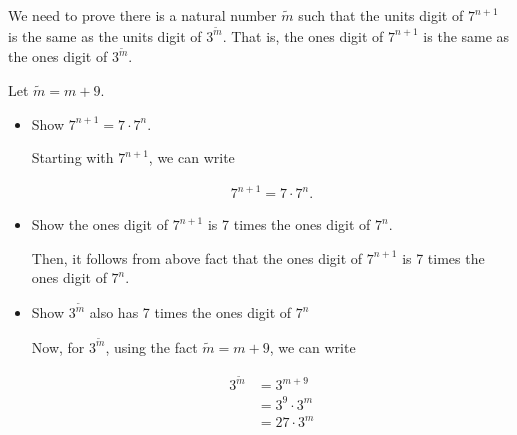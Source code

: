 \documentclass[12pt]{article}
\begin{document}
\begin{itemize}
\begin{mdframed}
\begin{enumerate}[1.]
            \bigskip

            We need to prove there is a natural number $\tilde{m}$ such that the
            units digit of $7^{n+1}$ is the same as the units digit of $3^{\tilde{m}}$.
            That is, the ones digit of $7^{n+1}$ is the same as the ones digit of $3^{\tilde{m}}$.

            \bigskip

            Let $\tilde{m} = m + 9$.

            \bigskip

            \begin{itemize}
                \item Show $7^{n+1} = 7 \cdot 7^n$.

                \begin{mdframed}
                Starting with $7^{n+1}$, we can write

                \begin{align}
                    7^{n+1} = 7 \cdot 7^n.
                \end{align}

                \end{mdframed}

                \item Show the ones digit of $7^{n+1}$ is 7 times the ones digit
                of $7^n$.

                \begin{mdframed}
                Then, it follows from above fact that the ones digit of $7^{n+1}$
                is 7 times the ones digit of $7^n$.
                \end{mdframed}

                \item Show $3^{\tilde{m}}$ also has 7 times the ones digit of $7^n$

                \begin{mdframed}
                Now, for $3^{\tilde{m}}$, using the fact $\tilde{m} = m + 9$, we
                can write

                \begin{align}
                    3^{\tilde{m}} &= 3^{m+9}\\
                    &= 3^9 \cdot 3^m\\
                    &= 27 \cdot 3^m
                \end{align}

                \bigskip


\end{mdframed}
\end{itemize}
\end{enumerate}
\end{mdframed}
\end{itemize}
\end{document}
